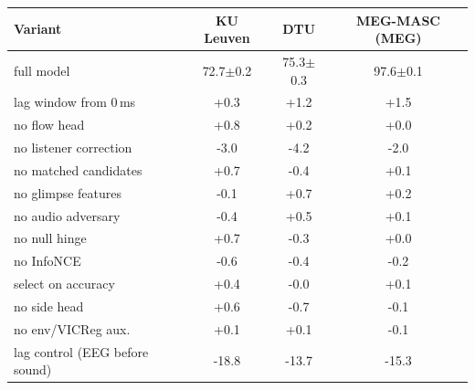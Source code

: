 \begin{tabular}{lccc}\toprule
Variant & KU Leuven & DTU & MEG-MASC (MEG) \\\midrule
full model & 72.7{\scriptsize$\pm$0.2} & 75.3{\scriptsize$\pm$0.3} & 97.6{\scriptsize$\pm$0.1} \\\midrule
lag window from 0\,ms & +0.3 & +1.2 & +1.5 \\
no flow head & +0.8 & +0.2 & +0.0 \\
no listener correction & -3.0 & -4.2 & -2.0 \\
no matched candidates & +0.7 & -0.4 & +0.1 \\
no glimpse features & -0.1 & +0.7 & +0.2 \\
no audio adversary & -0.4 & +0.5 & +0.1 \\
no null hinge & +0.7 & -0.3 & +0.0 \\
no InfoNCE & -0.6 & -0.4 & -0.2 \\
select on accuracy & +0.4 & -0.0 & +0.1 \\
no side head & +0.6 & -0.7 & -0.1 \\
no env/VICReg aux. & +0.1 & +0.1 & -0.1 \\
lag control (EEG before sound) & -18.8 & -13.7 & -15.3 \\
\bottomrule\end{tabular}
